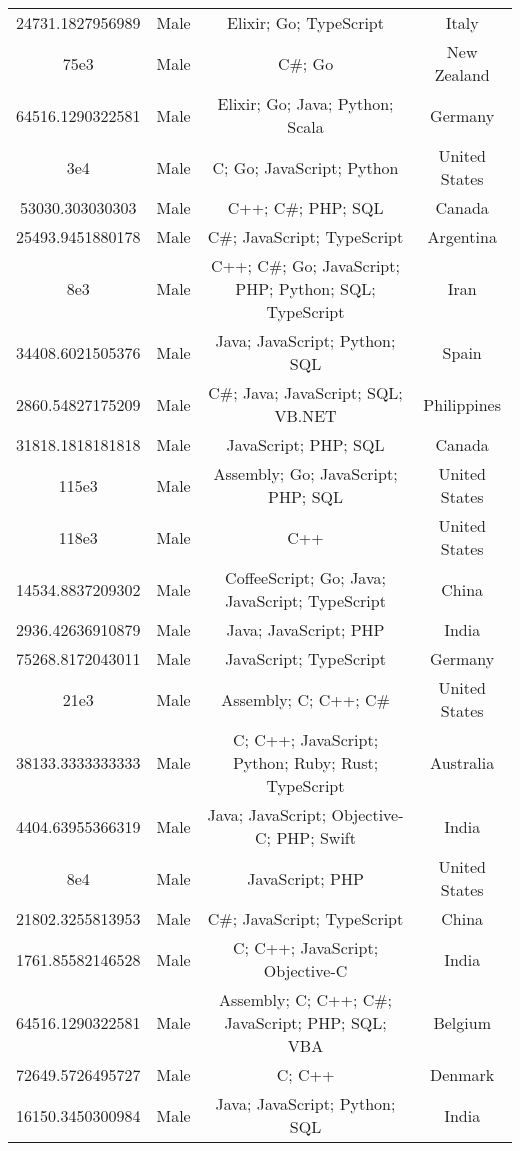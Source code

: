 \begin{center}
\begin{tabular}{ |c|c|c|c| }
24731.1827956989  &  Male  &  Elixir; Go; TypeScript  &  Italy  \\ 
75e3  &  Male  &  C\#; Go  &  New Zealand  \\ 
64516.1290322581  &  Male  &  Elixir; Go; Java; Python; Scala  &  Germany  \\ 
3e4  &  Male  &  C; Go; JavaScript; Python  &  United States  \\ 
53030.303030303  &  Male  &  C++; C\#; PHP; SQL  &  Canada  \\ 
25493.9451880178  &  Male  &  C\#; JavaScript; TypeScript  &  Argentina  \\ 
8e3  &  Male  &  C++; C\#; Go; JavaScript; PHP; Python; SQL; TypeScript  &  Iran  \\ 
34408.6021505376  &  Male  &  Java; JavaScript; Python; SQL  &  Spain  \\ 
2860.54827175209  &  Male  &  C\#; Java; JavaScript; SQL; VB.NET  &  Philippines  \\ 
31818.1818181818  &  Male  &  JavaScript; PHP; SQL  &  Canada  \\ 
115e3  &  Male  &  Assembly; Go; JavaScript; PHP; SQL  &  United States  \\ 
118e3  &  Male  &  C++  &  United States  \\ 
14534.8837209302  &  Male  &  CoffeeScript; Go; Java; JavaScript; TypeScript  &  China  \\ 
2936.42636910879  &  Male  &  Java; JavaScript; PHP  &  India  \\ 
75268.8172043011  &  Male  &  JavaScript; TypeScript  &  Germany  \\ 
21e3  &  Male  &  Assembly; C; C++; C\#  &  United States  \\ 
38133.3333333333  &  Male  &  C; C++; JavaScript; Python; Ruby; Rust; TypeScript  &  Australia  \\ 
4404.63955366319  &  Male  &  Java; JavaScript; Objective-C; PHP; Swift  &  India  \\ 
8e4  &  Male  &  JavaScript; PHP  &  United States  \\ 
21802.3255813953  &  Male  &  C\#; JavaScript; TypeScript  &  China  \\ 
1761.85582146528  &  Male  &  C; C++; JavaScript; Objective-C  &  India  \\ 
64516.1290322581  &  Male  &  Assembly; C; C++; C\#; JavaScript; PHP; SQL; VBA  &  Belgium  \\ 
72649.5726495727  &  Male  &  C; C++  &  Denmark  \\ 
16150.3450300984  &  Male  &  Java; JavaScript; Python; SQL  &  India  \\ 

\end{tabular}
\end{center}
